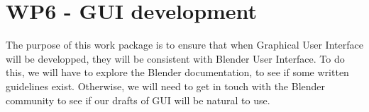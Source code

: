 \section{WP6 - GUI development}

The purpose of this work package is to ensure that when Graphical User Interface will be developped, they will be consistent with Blender User Interface. To do this, we will have to explore the Blender documentation, to see if some written guidelines exist. Otherwise, we will need to get in touch with the Blender community to see if our drafts of GUI will be natural to use.

